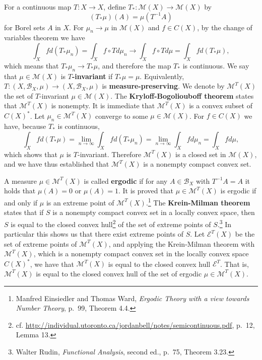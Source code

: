 \documentclass{article}
\theoremstyle{definition}
\begin{document}
For a continuous map $T:X \to X$, define $T_*:\mathscr{M}(X) \to \mathscr{M}(X)$
by
\[
(T_*\mu)(A) = \mu(T^{-1}A)
\]
for  Borel sets $A$ in $X$. 
 For $\mu_n \to \mu$ in $\mathscr{M}(X)$ and $f \in C(X)$, by the change of variables theorem we have
\[
\int_X f d(T_*\mu_n) = \int_X f \circ T d\mu_n \to \int_X f \circ T d\mu = \int_X f d(T_*\mu),
\]
which means that $T_*\mu_n \to T_*\mu$, and therefore the map $T_*$ is continuous.
We say that $\mu \in \mathscr{M}(X)$ is \textbf{$T$-invariant} if $T_*\mu = \mu$. Equivalently,
$T:(X,\mathscr{B}_X,\mu) \to (X,\mathscr{B}_X,\mu)$ is \textbf{measure-preserving}.
We denote by $\mathscr{M}^T(X)$ the set of $T$-invariant $\mu \in \mathscr{M}(X)$. 
The \textbf{Kryloff-Bogoliouboff theorem} states that $\mathscr{M}^T(X)$ is nonempty. It is immediate that $\mathscr{M}^T(X)$
is a convex subset of $C(X)^*$. Let $\mu_n \in \mathscr{M}^T(X)$ converge to some $\mu \in \mathscr{M}(X)$.
For $f \in C(X)$ we have,  because $T_*$ is continuous,
\[
\int_X f d(T_*\mu) = \lim_{n \to \infty} \int_X f d(T_* \mu_n) = \lim_{n \to \infty} \int_X f d\mu_n
= \int_X f d\mu,
\]
which shows that $\mu$ is $T$-invariant. Therefore $\mathscr{M}^T(X)$ is a closed set in
$\mathscr{M}(X)$, and we have thus established that $\mathscr{M}^T(X)$ is a nonempty compact convex set. 

A measure $\mu \in \mathscr{M}^T(X)$ is called \textbf{ergodic} if for
any $A \in \mathscr{B}_X$ with $T^{-1}A=A$ it holds that $\mu(A)=0$ or $\mu(A)=1$.
It is proved that $\mu \in \mathscr{M}^T(X)$ is ergodic if and only if $\mu$ is an extreme point
of $\mathscr{M}^T(X)$.\footnote{Manfred Einsiedler and Thomas Ward, {\em Ergodic Theory with a view towards Number Theory},
p.~99, Theorem 4.4.}
The \textbf{Krein-Milman theorem} states that if $S$ is a nonempty compact convex set in a locally
convex space, then $S$ is equal to the closed convex hull\footnote{cf. \url{http://individual.utoronto.ca/jordanbell/notes/semicontinuous.pdf},
p.~12, Lemma 13.} of the set of extreme  points of $S$.\footnote{Walter Rudin, {\em Functional Analysis},
second ed., p.~75, Theorem 3.23.} 
In particular this shows us that there exist extreme points of $S$.
Let $\mathscr{E}^T(X)$ be the set of extreme points of $\mathscr{M}^T(X)$, and
applying the Krein-Milman theorem with $\mathscr{M}^T(X)$, which is a nonempty compact convex set in the locally
convex space $C(X)^*$,
we have that $\mathscr{M}^T(X)$ is equal to the closed convex hull $\mathscr{E}^T$.
That is, $\mathscr{M}^T(X)$ is equal to the closed convex hull of the set of ergodic $\mu \in \mathscr{M}^T(X)$. 
\end{document}
